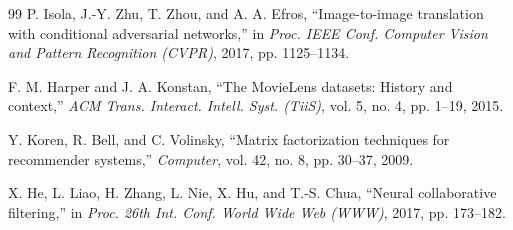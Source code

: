 \documentclass[10pt,twocolumn]{article}
\begin{document}
\begin{thebibliography}{99}
P. Isola, J.-Y. Zhu, T. Zhou, and A. A. Efros, ``Image-to-image translation with conditional
adversarial networks,'' in \emph{Proc. IEEE Conf. Computer Vision and Pattern Recognition
(CVPR)}, 2017, pp. 1125--1134.

F. M. Harper and J. A. Konstan, ``The MovieLens datasets: History and context,'' \emph{ACM
Trans. Interact. Intell. Syst. (TiiS)}, vol. 5, no. 4, pp. 1--19, 2015.

Y. Koren, R. Bell, and C. Volinsky, ``Matrix factorization techniques for recommender systems,''
\emph{Computer}, vol. 42, no. 8, pp. 30--37, 2009.

X. He, L. Liao, H. Zhang, L. Nie, X. Hu, and T.-S. Chua, ``Neural collaborative filtering,'' in
\emph{Proc. 26th Int. Conf. World Wide Web (WWW)}, 2017, pp. 173--182.

\end{thebibliography}
\end{document}
